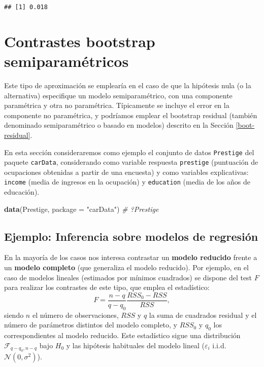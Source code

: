 \documentclass[]{book}
\newenvironment{Shaded}{\begin{snugshade}}{\end{snugshade}}
\newcommand{\KeywordTok}[1]{\textcolor[rgb]{0.13,0.29,0.53}{\textbf{#1}}}
\newcommand{\DataTypeTok}[1]{\textcolor[rgb]{0.13,0.29,0.53}{#1}}
\newcommand{\StringTok}[1]{\textcolor[rgb]{0.31,0.60,0.02}{#1}}
\newcommand{\CommentTok}[1]{\textcolor[rgb]{0.56,0.35,0.01}{\textit{#1}}}
\newcommand{\NormalTok}[1]{#1}
\theoremstyle{break}
\theoremstyle{definition}
\theoremstyle{definition}
\theoremstyle{definition}
\theoremstyle{remark}
\begin{document}
\begin{verbatim}
## [1] 0.018
\end{verbatim}

\section{Contrastes bootstrap
semiparamétricos}\label{contrastes-semiparametricos}

Este tipo de aproximación se emplearía en el caso de que la hipótesis
nula (o la alternativa) especifique un modelo semiparamétrico, con una
componente paramétrica y otra no paramétrica. Típicamente se incluye el
error en la componente no paramétrica, y podríamos emplear el bootstrap
residual (también denominado semiparamétrico o basado en modelos)
descrito en la Sección \ref{boot-residual}.

En esta sección consideraremos como ejemplo el conjunto de datos
\texttt{Prestige} del paquete \texttt{carData}, considerando como
variable respuesta \texttt{prestige} (puntuación de ocupaciones
obtenidas a partir de una encuesta) y como variables explicativas:
\texttt{income} (media de ingresos en la ocupación) y \texttt{education}
(media de los años de educación).

\begin{Shaded}
\begin{Highlighting}[]
\KeywordTok{data}\NormalTok{(Prestige, }\DataTypeTok{package =} \StringTok{"carData"}\NormalTok{)}
\CommentTok{# ?Prestige}
\end{Highlighting}
\end{Shaded}

\subsection{Ejemplo: Inferencia sobre modelos de
regresión}\label{ejemplo-inferencia-sobre-modelos-de-regresiuxf3n}

En la mayoría de los casos nos interesa contrastar un \textbf{modelo
reducido} frente a un \textbf{modelo completo} (que generaliza el modelo
reducido). Por ejemplo, en el caso de modelos lineales (estimados por
mínimos cuadrados) se dispone del test \(F\) para realizar los
contrastes de este tipo, que emplea el estadístico:
\[F=\frac{n - q}{q - q_0}\frac{RSS_0 - RSS}{RSS},\] siendo \(n\) el
número de observaciones, \(RSS\) y \(q\) la suma de cuadrados residual y
el número de parámetros distintos del modelo completo, y \(RSS_0\) y
\(q_0\) los correspondientes al modelo reducido. Este estadístico sigue
una distribución \(\mathcal{F}_{q - q_0, n - q}\) bajo \(H_0\) y las
hipótesis habituales del modelo lineal (\(\varepsilon_i\) i.i.d.
\(\mathcal{N}(0, \sigma^2)\)).
\end{document}
